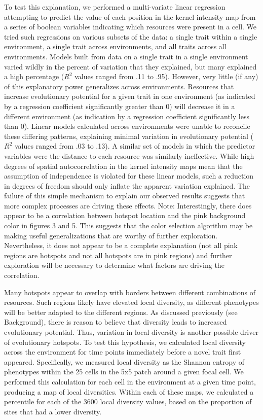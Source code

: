 To test this explanation, we performed a multi-variate linear regression attempting to predict the value of each position in the kernel intensity map from a series of boolean variables indicating which resources were present in a cell. We tried such regressions on various subsets of the data: a single trait within a single environment, a single trait across environments, and all traits across all environments. Models built from data on a single trait in a single environment varied wildly in the percent of variation that they explained, but many explained a high percentage ($R^{2}$ values ranged from .11 to .95). However, very little (if any) of this explanatory power generalizes across environments. Resources that increase evolutionary potential for a given trait in one environment (as indicated by a regression coefficient significantly greater than 0) will decrease it in a different environment (as indication by a regression coefficient significantly less than 0). Linear models calculated across environments were unable to reconcile these differing patterns, explaining minimal variation in evolutionary potential ($R^{2}$ values ranged from .03 to .13). A similar set of models in which the predictor variables were the distance to each resource was similarly ineffective. While high degrees of spatial autocorrelation in the kernel intensity maps mean that the assumption of independence is violated for these linear models, such a reduction in degrees of freedom should only inflate the apparent variation explained. The failure of this simple mechanism to explain our observed results suggests that more complex processes are driving these effects. Note: Interestingly, there does appear to be a correlation between hotspot location and the pink background color in figures 3 and 5. This suggests that the color selection algorithm may be making useful generalizations that are worthy of further exploration. Nevertheless, it does not appear to be a complete explanation (not all pink regions are hotspots and not all hotspots are in pink regions) and further exploration will be necessary to determine what factors are driving the correlation. 

Many hotspots appear to overlap with borders between different combinations of resources. Such regions likely have elevated local diversity, as different phenotypes will be better adapted to the different regions. As discussed previously (see Background), there is reason to believe that diversity leads to increased evolutionary potential. Thus, variation in local diversity is another possible driver of evolutionary hotspots. To test this hypothesis, we calculated local diversity across the environment for time points immediately before a novel trait first appeared. Specifically, we measured local diversity as the Shannon entropy of phenotypes within the 25 cells in the 5x5 patch around a given focal cell. We performed this calculation for each cell in the environment at a given time point, producing a map of local diversities. Within each of these maps, we calculated a percentile for each of the 3600 local diversity values, based on the proportion of sites that had a lower diversity.


